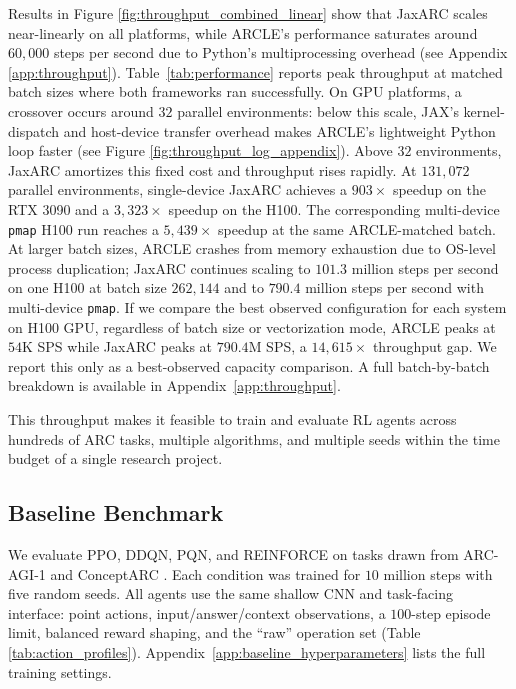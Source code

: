 Results in Figure \ref{fig:throughput_combined_linear} show that JaxARC scales near-linearly on all platforms, while ARCLE's performance saturates around $60,000$ steps per second due to Python's multiprocessing overhead (see Appendix \ref{app:throughput}). Table~\ref{tab:performance} reports peak throughput at matched batch sizes where both frameworks ran successfully. On GPU platforms, a crossover occurs around $32$ parallel environments: below this scale, JAX's kernel-dispatch and host-device transfer overhead makes ARCLE's lightweight Python loop faster (see Figure \ref{fig:throughput_log_appendix}). Above $32$ environments, JaxARC amortizes this fixed cost and throughput rises rapidly. At $131,072$ parallel environments, single-device JaxARC achieves a $903\times$ speedup on the RTX 3090 and a $3,323\times$ speedup on the H100. The corresponding multi-device \texttt{pmap} H100 run reaches a $5,439\times$ speedup at the same ARCLE-matched batch. At larger batch sizes, ARCLE crashes from memory exhaustion due to OS-level process duplication; JaxARC continues scaling to $101.3$ million steps per second on one H100 at batch size $262,144$ and to $790.4$ million steps per second with multi-device \texttt{pmap}. If we compare the best observed configuration for each system on H100 GPU, regardless of batch size or vectorization mode, ARCLE peaks at $54$K SPS while JaxARC peaks at $790.4$M SPS, a $14,615\times$ throughput gap. We report this only as a best-observed capacity comparison. A full batch-by-batch breakdown is available in Appendix~\ref{app:throughput}. 

This throughput makes it feasible to train and evaluate RL agents across hundreds of ARC tasks, multiple algorithms, and multiple seeds within the time budget of a single research project.

\subsection{Baseline Benchmark}
\label{sec:baselines}

We evaluate PPO, DDQN, PQN, and REINFORCE on tasks drawn from ARC-AGI-1 \citep{cholletMeasureIntelligence2019} and ConceptARC \citep{moskvichevConceptARCBenchmarkEvaluating2023}. Each condition was trained for $10$ million steps with five random seeds. All agents use the same shallow CNN and task-facing interface: point actions, input/answer/context observations, a $100$-step episode limit, balanced reward shaping, and the ``raw'' operation set (Table \ref{tab:action_profiles}). Appendix~\ref{app:baseline_hyperparameters} lists the full training settings.

